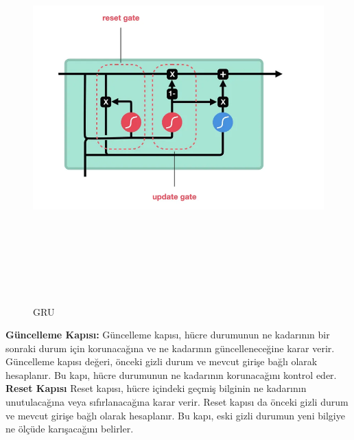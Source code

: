 \documentclass[12pt,a4paper]{article}
\begin{document}
\begin{enumerate}
\begin{figure}[h]
  	\vspace{0.4cm} 
  	\centering
  	 \includegraphics[width=15cm,height=15cm,keepaspectratio]{GRUmimarisi.png }
  	\caption{GRU\cite{GRU}}
  		\vspace{0.4cm}
  	
  \end{figure}
  \par
  {\bf\fontsize{12pt}{14pt} Güncelleme Kapısı:}
Güncelleme kapısı, hücre durumunun ne kadarının bir sonraki durum için korunacağına ve ne kadarının güncelleneceğine karar verir. Güncelleme kapısı değeri, önceki gizli durum ve mevcut girişe bağlı olarak hesaplanır. Bu kapı, hücre durumunun ne kadarının korunacağını kontrol eder.
\newpage
{\bf\fontsize{12pt}{14pt} Reset Kapısı}
  Reset kapısı, hücre içindeki geçmiş bilginin ne kadarının unutulacağına veya sıfırlanacağına karar verir. Reset kapısı da önceki gizli durum ve mevcut girişe bağlı olarak hesaplanır. Bu kapı, eski gizli durumun yeni bilgiye ne ölçüde karışacağını belirler.


\end{enumerate}
\end{document}
